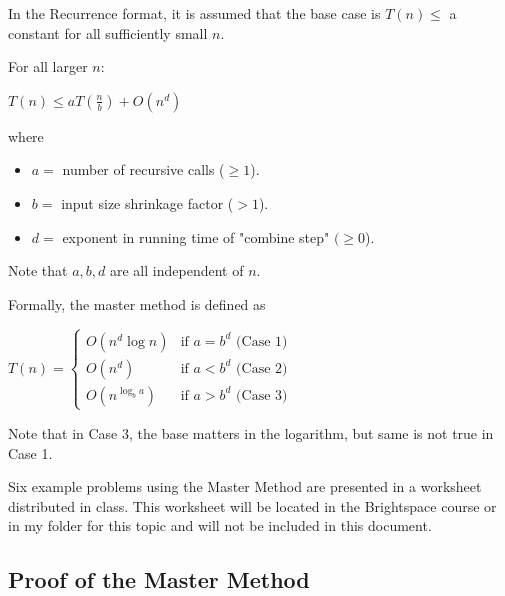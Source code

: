 \documentclass[11pt]{article}
\newenvironment{aside}
  {\begin{mdframed}[style=0,%
      leftline=false,rightline=false,leftmargin=2em,rightmargin=2em,%
          innerleftmargin=0pt,innerrightmargin=0pt,linewidth=0.75pt,%
      skipabove=7pt,skipbelow=7pt]\small}
  {\end{mdframed}}
\newcommand{\myeq}[1]{
    \vspace{11pt}
    \begin{center}
        ${#1}$
    \end{center}
    \vspace{11pt}
}
\begin{document}
In the Recurrence format, it is assumed that the base case is $T(n) \leq $ a constant for all sufficiently small $n$.

For all larger $n$:

\myeq{T(n) \leq aT(\frac{n}{b}) + O(n^d)}

where
\begin{itemize}
    \item $a = $ number of recursive calls ($\geq 1$).
    \item $b = $ input size shrinkage factor ($>1$).
    \item $d = $ exponent in running time of "combine step" $( \geq 0$).
\end{itemize}
\vspace{11pt}

\begin{aside}
    Note that $a,b,d$ are all independent of $n$.
\end{aside}
\vspace{11pt}

\newpage
Formally, the master method is defined as

\vspace{11pt}
\begin{center}
    $T(n) = \begin{cases} 
    O(n^d \log n) & \text{if } a = b^d \text{ (Case 1)} \\
    O(n^d) & \text{if } a < b^d \text{ (Case 2)} \\
    O(n^{\log_b a}) & \text{if } a > b^d \text{ (Case 3)}
    \end{cases}$    
\end{center}
\vspace{11pt}

\begin{aside}
    Note that in Case 3, the base matters in the logarithm, but same is not true in Case 1.
\end{aside}
\vspace{11pt}

Six example problems using the Master Method are presented in a worksheet distributed in class. This worksheet will be located in the Brightspace course or in my folder for this topic and will not be included in this document.

\vspace{11pt}
\subsection{Proof of the Master Method}
\vspace{11pt}
\end{document}
